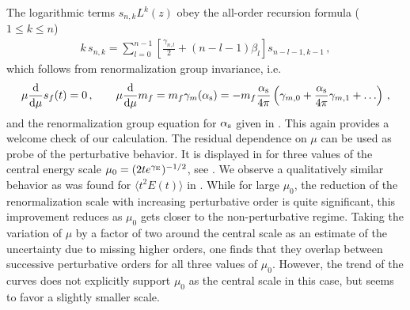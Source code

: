 The logarithmic terms $s_{n,k}L^k(z)$ obey the all-order recursion formula ($1\leq k\leq n$)
\begin{equation}
  \begin{split}
k\,s_{n,k} = \sum_{l=0}^{n-1}\left[\frac{\gamma_{n,l}}{2} +
  (n-l-1)\beta_l\right]s_{n-l-1,k-1}\,,
  \end{split}
\end{equation}
which follows from renormalization group
invariance, i.e.
\begin{equation}
  \begin{split}
    \mu\frac{{\rm d} }{{\rm d} \mu} s_f(t) = 0\,,\qquad
    \mu\frac{{\rm d} }{{\rm d} \mu}m_f = m_f\gamma_m(\alpha_\mathrm{s}) =
    - m_f\frac{\alpha_\mathrm{s}}{4\pi}\left(\gamma_{m,0} +
    \frac{\alpha_\mathrm{s}}{4\pi}\gamma_{m,1} + \ldots\right)\,,
  \end{split}
\end{equation}
and the renormalization group equation for $\alpha_\mathrm{s}$ given in
. This again provides a welcome check of our calculation.
The residual dependence on $\mu$ can be used as probe of the
perturbative behavior. It is displayed in  for three
values of the central energy scale $\mu_0=(2te^{\gamma_\mathrm{E}})^{-1/2}$,
see . We observe a qualitatively similar behavior as was
found for $\langle t^2E(t)\rangle$ in . While
for large $\mu_0$, the reduction of the renormalization scale with
increasing perturbative order is quite significant, this improvement
reduces as $\mu_0$ gets closer to the non-perturbative regime. Taking
the variation of $\mu$ by a factor of two around the central scale as an
estimate of the uncertainty due to missing higher orders, one finds that
they overlap between successive perturbative orders for all three values
of $\mu_0$. However, the trend of the curves does not explicitly
support $\mu_0$ as the central scale in this case, but seems to favor a
slightly smaller scale.

